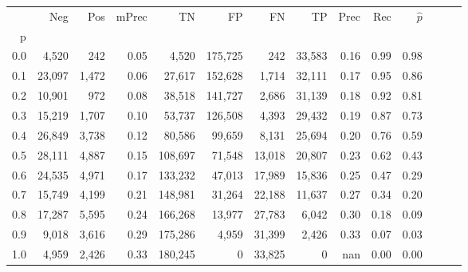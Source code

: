\begin{tabular}{rrrrrrrrrrrrrr}
\toprule
{} &     Neg &    Pos & mPrec &       TN &       FP &      FN &      TP &  Prec &   Rec & $\hat{p}$ \\
p   &         &        &       &          &          &         &         &       &       &           \\
\midrule
0.0 &   4,520 &    242 &  0.05 &    4,520 &  175,725 &     242 &  33,583 &  0.16 &  0.99 &      0.98 \\
0.1 &  23,097 &  1,472 &  0.06 &   27,617 &  152,628 &   1,714 &  32,111 &  0.17 &  0.95 &      0.86 \\
0.2 &  10,901 &    972 &  0.08 &   38,518 &  141,727 &   2,686 &  31,139 &  0.18 &  0.92 &      0.81 \\
0.3 &  15,219 &  1,707 &  0.10 &   53,737 &  126,508 &   4,393 &  29,432 &  0.19 &  0.87 &      0.73 \\
0.4 &  26,849 &  3,738 &  0.12 &   80,586 &   99,659 &   8,131 &  25,694 &  0.20 &  0.76 &      0.59 \\
0.5 &  28,111 &  4,887 &  0.15 &  108,697 &   71,548 &  13,018 &  20,807 &  0.23 &  0.62 &      0.43 \\
0.6 &  24,535 &  4,971 &  0.17 &  133,232 &   47,013 &  17,989 &  15,836 &  0.25 &  0.47 &      0.29 \\
0.7 &  15,749 &  4,199 &  0.21 &  148,981 &   31,264 &  22,188 &  11,637 &  0.27 &  0.34 &      0.20 \\
0.8 &  17,287 &  5,595 &  0.24 &  166,268 &   13,977 &  27,783 &   6,042 &  0.30 &  0.18 &      0.09 \\
0.9 &   9,018 &  3,616 &  0.29 &  175,286 &    4,959 &  31,399 &   2,426 &  0.33 &  0.07 &      0.03 \\
1.0 &   4,959 &  2,426 &  0.33 &  180,245 &        0 &  33,825 &       0 &   nan &  0.00 &      0.00 \\
\bottomrule
\end{tabular}
